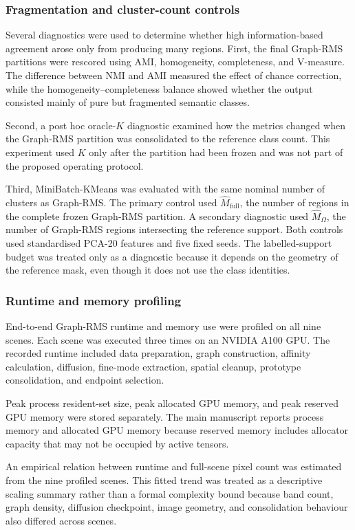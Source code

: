 \documentclass[10pt,a4paper,fleqn]{article}
\begin{document}
\subsubsection{Fragmentation and cluster-count controls}

Several diagnostics were used to determine whether high information-based
agreement arose only from producing many regions. First, the final Graph-RMS
partitions were rescored using AMI, homogeneity, completeness, and V-measure.
The difference between NMI and AMI measured the effect of chance correction,
while the homogeneity--completeness balance showed whether the output consisted
mainly of pure but fragmented semantic classes.

Second, a post hoc oracle-\(K\) diagnostic examined how the metrics changed
when the Graph-RMS partition was consolidated to the reference class count.
This experiment used \(K\) only after the partition had been frozen
and was not part of the proposed operating protocol.

Third, MiniBatch-KMeans was evaluated with the same nominal number of clusters
as Graph-RMS. The primary control used
\(\widehat{M}_{\mathrm{full}}\), the number of regions in the complete frozen
Graph-RMS partition. A secondary diagnostic used
\(\widehat{M}_{\Omega}\), the number of Graph-RMS regions intersecting the
reference support. Both controls used standardised PCA-20 features and five
fixed seeds. The labelled-support budget was treated only as a diagnostic
because it depends on the geometry of the reference mask, even though it does
not use the class identities.

\subsubsection{Runtime and memory profiling}

End-to-end Graph-RMS runtime and memory use were profiled on all nine scenes.
Each scene was executed three times on an NVIDIA A100 GPU. The recorded runtime
included data preparation, graph construction, affinity calculation, diffusion,
fine-mode extraction, spatial cleanup, prototype consolidation, and endpoint
selection.

Peak process resident-set size, peak allocated GPU memory, and peak reserved
GPU memory were stored separately. The main manuscript reports process memory
and allocated GPU memory because reserved memory includes allocator capacity
that may not be occupied by active tensors.

An empirical relation between runtime and full-scene pixel count was estimated
from the nine profiled scenes. This fitted trend was treated as a descriptive
scaling summary rather than a formal complexity bound because band count,
graph density, diffusion checkpoint, image geometry, and consolidation
behaviour also differed across scenes.
\end{document}
